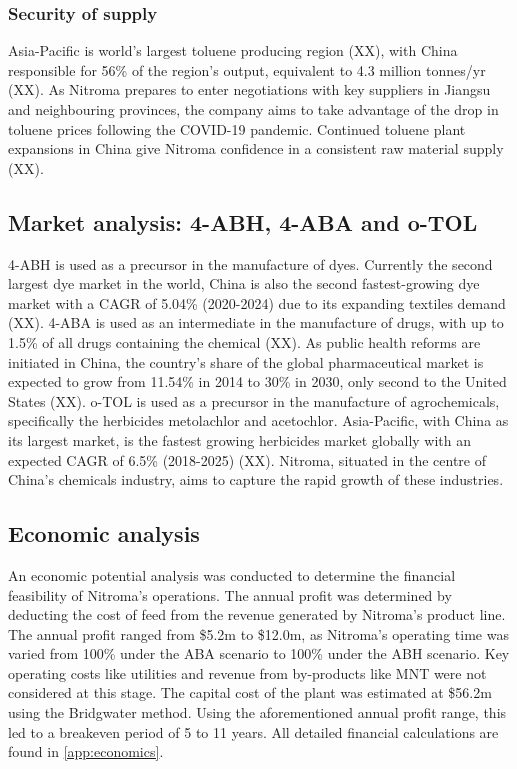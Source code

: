 \subsubsection{Security of supply}
Asia-Pacific is world's largest toluene producing region (XX), with China responsible for 56\% of the region’s output, equivalent to 4.3 million tonnes/yr (XX). As Nitroma prepares to enter negotiations with key suppliers in Jiangsu and neighbouring provinces, the company aims to take advantage of the drop in toluene prices following the COVID-19 pandemic. Continued toluene plant expansions in China give Nitroma confidence in a consistent raw material supply (XX).

\subsection{Market analysis: 4-ABH, 4-ABA and o-TOL}
4-ABH is used as a precursor in the manufacture of dyes. Currently the second largest dye market in the world, China is also the second fastest-growing dye market with a CAGR of 5.04\% (2020-2024) due to its expanding textiles demand (XX). 4-ABA is used as an intermediate in the manufacture of drugs, with up to 1.5\% of all drugs containing the chemical (XX). As public health reforms are initiated in China, the country’s share of the global pharmaceutical market is expected to grow from 11.54\% in 2014 to 30\% in 2030, only second to the United States (XX). o-TOL is used as a precursor in the manufacture of agrochemicals, specifically the herbicides metolachlor and acetochlor. Asia-Pacific, with China as its largest market, is the fastest growing herbicides market globally with an expected CAGR of 6.5\% (2018-2025) (XX). Nitroma, situated in the centre of China’s chemicals industry, aims to capture the rapid growth of these industries.  

\subsection{Economic analysis}
An economic potential analysis was conducted to determine the financial feasibility of Nitroma’s operations. The annual profit was determined by deducting the cost of feed from the revenue generated by Nitroma's product line. The annual profit ranged from \$5.2m to \$12.0m, as Nitroma's operating time was varied from 100\% under the ABA scenario to 100\% under the ABH scenario. Key operating costs like utilities and revenue from by-products like MNT were not considered at this stage. The capital cost of the plant was estimated at \$56.2m using the Bridgwater method. Using the aforementioned annual profit range, this led to a breakeven period of 5 to 11 years. All detailed financial calculations are found in \cref{app:economics}.